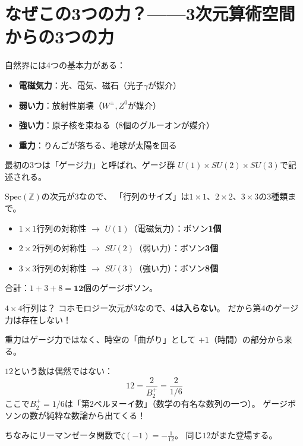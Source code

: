 \documentclass[12pt,a4paper]{article}
\begin{document}
\section{なぜこの3つの力？——3次元算術空間からの3つの力}

\begin{ideabox}[力とは何か]
自然界には4つの基本力がある：
\begin{itemize}
\item \textbf{電磁気力}：光、電気、磁石（光子$\gamma$が媒介）
\item \textbf{弱い力}：放射性崩壊（$W^\pm, Z^0$が媒介）
\item \textbf{強い力}：原子核を束ねる（8個のグルーオンが媒介）
\item \textbf{重力}：りんごが落ちる、地球が太陽を回る
\end{itemize}

最初の3つは「ゲージ力」と呼ばれ、ゲージ群
$U(1)\times SU(2)\times SU(3)$で記述される。
\end{ideabox}

\begin{mathbox}[算術的空間の次元$=3$が力を決める]
$\mathrm{Spec}(\mathbb{Z})$の次元が$3$なので、
「行列のサイズ」は$1\times 1$、$2\times 2$、$3\times 3$の3種類まで。

\begin{itemize}
\item $1\times 1$行列の対称性 $\to$ $U(1)$（電磁気力）：ボソン\textbf{1個}
\item $2\times 2$行列の対称性 $\to$ $SU(2)$（弱い力）：ボソン\textbf{3個}
\item $3\times 3$行列の対称性 $\to$ $SU(3)$（強い力）：ボソン\textbf{8個}
\end{itemize}

合計：$1+3+8=\mathbf{12}$個のゲージボソン。

$4\times 4$行列は？ コホモロジー次元が$3$なので、\textbf{4は入らない}。
だから第4のゲージ力は存在しない！

重力はゲージ力ではなく、時空の「曲がり」として
$+1$（時間）の部分から来る。
\end{mathbox}

\begin{funbox}[「12」の秘密]
$12$という数は偶然ではない：
\[
  12 = \frac{2}{B_2^+} = \frac{2}{1/6}
\]
ここで$B_2^+ = 1/6$は「第2ベルヌーイ数」（数学の有名な数列の一つ）。
ゲージボソンの数が純粋な数論から出てくる！

ちなみにリーマンゼータ関数で$\zeta(-1) = -\frac{1}{12}$。
同じ$12$がまた登場する。
\end{funbox}
\end{document}
